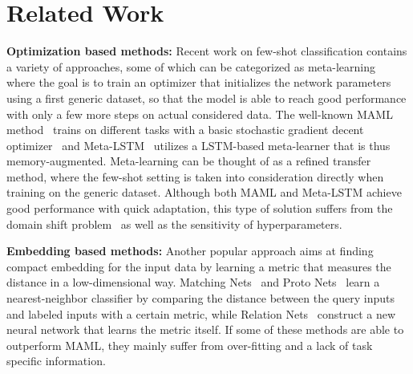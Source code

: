 \documentclass[a4paper,conference]{IEEEtran}
\begin{document}
\section{Related Work}
\label{sec:rw}
\textbf{Optimization based methods:} Recent work on few-shot classification contains a variety of approaches, some of which can be categorized as meta-learning~\cite{thrun2012learning} where the goal is to train an optimizer that initializes the network parameters using a first generic dataset, so that the model is able to reach good performance with only a few more steps on actual considered data. The well-known MAML method~\cite{finn2017model} trains on different tasks with a basic stochastic gradient decent optimizer~\cite{chen2019closer} and Meta-LSTM~\cite{ravi2016optimization} utilizes a LSTM-based meta-learner that is thus memory-augmented. Meta-learning can be thought of as a refined transfer method, where the few-shot setting is taken into consideration directly when training on the generic dataset. Although both MAML and Meta-LSTM achieve good performance with quick adaptation, this type of solution suffers from the domain shift problem~\cite{chen2019closer} as well as the sensitivity of hyperparameters.

\textbf{Embedding based methods:} Another popular approach aims at finding compact embedding for the input data by learning a metric that measures the distance in a low-dimensional way. Matching Nets~\cite{vinyals2016matching} and Proto Nets~\cite{snell2017prototypical} learn a nearest-neighbor classifier by comparing the distance between the query inputs and labeled inputs with a certain metric, while Relation Nets~\cite{sung2018learning} construct a new neural network that learns the metric itself. If some of these methods are able to outperform MAML, they mainly suffer from over-fitting and a lack of task specific information. 
\end{document}
